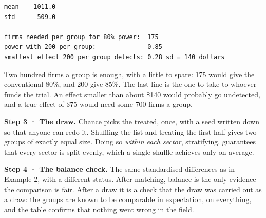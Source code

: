 \documentclass[
  letterpaper,
  10pt,
  twoside,
  openright,
  numbers=noenddot,
  chapterprefix=true]{scrbook}
\begin{document}
\begin{verbatim}
mean    1011.0
std      509.0

firms needed per group for 80% power:  175
power with 200 per group:              0.85
smallest effect 200 per group detects: 0.28 sd = 140 dollars
\end{verbatim}

Two hundred firms a group is enough, with a little to spare: 175 would
give the conventional 80\%, and 200 give 85\%. The last line is the one
to take to whoever funds the trial. An effect smaller than about \$140
would probably go undetected, and a true effect of \$75 would need some
700 firms a group.

\textbf{Step 3 · The draw.} Chance picks the treated, once, with a seed
written down so that anyone can redo it. Shuffling the list and treating
the first half gives two groups of exactly equal size. Doing so
\emph{within each sector}, stratifying, guarantees that every sector is
split evenly, which a single shuffle achieves only on average.

\textbf{Step 4 · The balance check.} The same standardised differences
as in Example 2, with a different status. After matching, balance is the
only evidence the comparison is fair. After a draw it is a check that
the draw was carried out as a draw: the groups are known to be
comparable in expectation, on everything, and the table confirms that
nothing went wrong in the field.
\end{document}
